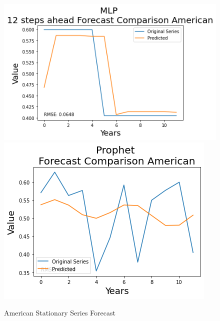 \documentclass[10pt,twocolumn,letterpaper]{article}
\begin{document}
\begin{figure}[h]
		\includegraphics[width=0.45\linewidth]{../img/MLP/american_diff_for}
		\includegraphics[width=0.45\linewidth]{../img/Prophet/american_diff_for}
		\caption{American Stationary Series Forecast}
		\label{fig:americandiffforecast}
	\end{figure}
	
\end{document}
